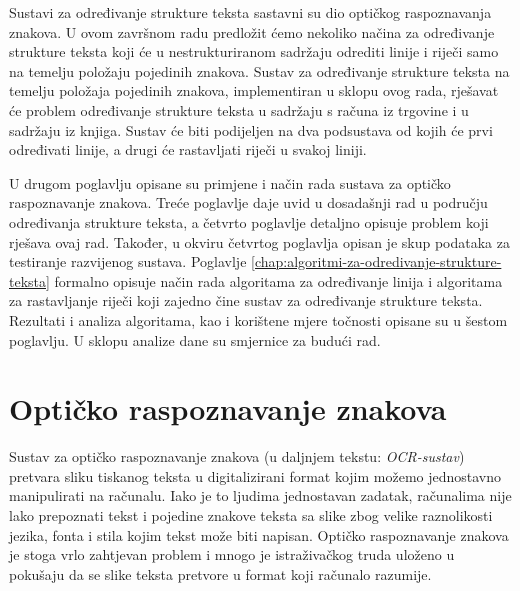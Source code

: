 \documentclass[times, utf8, zavrsni]{fer}
\begin{document}
Sustavi za određivanje strukture teksta sastavni su dio optičkog raspoznavanja
znakova. U ovom završnom radu predložit ćemo nekoliko načina za određivanje
strukture teksta koji će u nestrukturiranom sadržaju odrediti linije i riječi
samo na temelju položaju pojedinih znakova. Sustav za određivanje strukture
teksta na temelju položaja pojedinih znakova, implementiran u sklopu ovog rada,
rješavat će problem određivanje strukture teksta u sadržaju s računa iz
trgovine i u sadržaju iz knjiga. Sustav će biti podijeljen na dva podsustava od
kojih će prvi određivati linije, a drugi će rastavljati riječi u svakoj liniji.

U drugom poglavlju opisane su primjene i način rada sustava za optičko
raspoznavanje znakova. Treće poglavlje daje uvid u dosadašnji rad u području
određivanja strukture teksta, a četvrto poglavlje detaljno opisuje problem koji
rješava ovaj rad. Također, u okviru četvrtog poglavlja opisan je skup
podataka za testiranje razvijenog sustava. Poglavlje
\ref{chap:algoritmi-za-odredivanje-strukture-teksta} formalno opisuje način rada
algoritama za određivanje linija i algoritama za rastavljanje riječi koji
zajedno čine sustav za određivanje strukture teksta. Rezultati i analiza
algoritama, kao i korištene mjere točnosti opisane su u šestom poglavlju. U
sklopu analize dane su smjernice za budući rad.
















\chapter{Optičko raspoznavanje znakova}
\label{chap:opticko-raspoznavanje-znakova}
Sustav za optičko raspoznavanje znakova  (u
daljnjem tekstu: \emph{OCR-sustav})
pretvara sliku tiskanog teksta u digitalizirani format kojim možemo jednostavno
manipulirati na računalu.
Iako je to ljudima jednostavan zadatak, računalima nije lako prepoznati tekst i
pojedine znakove teksta sa slike
zbog velike raznolikosti jezika, fonta i stila kojim tekst može biti napisan.
Optičko raspoznavanje znakova je stoga vrlo zahtjevan problem i mnogo je
istraživačkog truda uloženo u pokušaju
da se slike teksta pretvore u format koji računalo razumije. \citep
{DBLP:journals/corr/abs-1710-05703}
\end{document}
